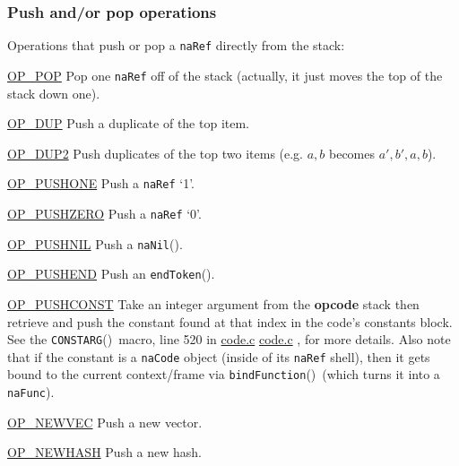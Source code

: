\documentclass{article}
\newcommand{\type}[1]{\textcolor{type}{\tt #1}}
\newcommand{\func}[1]{\textcolor{func}{\tt #1}}
\newcommand{\globalmacro}[1]{\textcolor{func}{\tt #1}}
\newcommand{\nasalsourcefile}[2][]{%
  \ifthenelse{\isempty{#1}}%
    {%
      \textcolor{source}{%
        \href{https://github.com/andyross/nasal/blob/master/src/#2}{#2}%
      }%
    }%
    {%
      \textcolor{source}{%
        \href{https://github.com/andyross/nasal/blob/master/src/#2\#L#1}{#2}%
      }%
    }%
}
\newcommand{\OP} [1]{\hyperref[op:#1]{\textcolor{opcode}{OP\_#1}}}
\newcommand{\fp}{\textcolor{func}{()}}
\begin{document}
\subsubsection{Push and/or pop operations}
Operations that push or pop a \type{naRef} directly from the stack:
\begin{description}
    \item \OP{POP} \label{op:POP} \label{op:Pop} Pop one \type{naRef} off of the stack (actually, it just moves the top of the stack down one).
    \item \OP{DUP} \label{op:DUP} \label{op:Dup} Push a duplicate of the top item.
    \item \OP{DUP2}\label{op:DUP2}\label{op:Dup2} Push duplicates of the top two items (e.g. $a, b$ becomes $a', b', a, b$).
    \item \OP{PUSHONE}  \label{op:PUSHONE}\label{op:Pushone} Push a \type{naRef} `1'.
    \item \OP{PUSHZERO} \label{op:PUSHZERO}\label{op:Pushzero} Push a \type{naRef} `0'.
    \item \OP{PUSHNIL}  \label{op:PUSHNIL}\label{op:Pushnil}  Push a \func{naNil}\fp.
    \item \OP{PUSHEND}  \label{op:PUSHEND}\label{op:Pushend} Push an \func{endToken}\fp.
    \item \OP{PUSHCONST}\label{op:PUSHCONST}\label{op:Pushconst} Take an integer argument from the {\bf opcode} stack then retrieve and push the constant found at that index in the code's constants block.  See the \globalmacro{CONSTARG}\fp\ macro, line 520 in \nasalsourcefile[520]{code.c}, for more details.  Also note that if the constant is a \type{naCode} object (inside of its \type{naRef} shell), then it gets bound to the current context/frame via \func{bindFunction}\fp\ (which turns it into a \type{naFunc}).
    \item \OP{NEWVEC}   \label{op:NEWVEC}\label{op:Newvec}  Push a new vector.
    \item \OP{NEWHASH}  \label{op:NEWHASH}\label{op:Newhash} Push a new hash.
\end{description}
\end{document}
